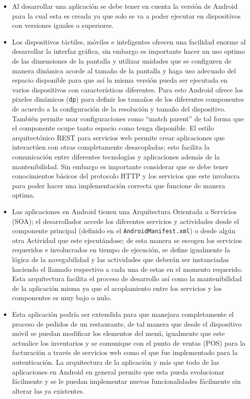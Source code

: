\documentclass[letterpaper,12pt]{book}
\begin{document}
\begin{mainmatter}
\begin{itemize}
\item Al desarrollar  una aplicación se debe  tener en cuenta  la versión de
Android para la cual esta es creada ya que solo se va a poder ejecutar
en dispositivos con versiones iguales o superiores.

\item Los  dispositivos   táctiles,  móviles  e   inteligentes  ofrecen  una
facilidad enorme  al desarrollar la  interfaz gráfica, sin  embargo es
importante hacer  un uso  optimo de las  dimensiones de la  pantalla y
utilizar  unidades que  se  configuren de  manera  dinámica acorde  al
tamaño de la pantalla y  haga uso adecuado del espacio disponible para
que así  la misma versión  pueda ser ejecutada en  varios dispositivos
con características  diferentes. Para esto Android  ofrece los pixeles
dinámicos (\texttt{dp}) para definir  los tamaños de los diferentes componentes
de  acuerdo  a  la  configuración   de  la  resolución  y  tamaño  del
dispositivo. También permite  usar configuraciones como “match parent”
de  tal  forma  que  el  componente ocupe  tanto  espacio  como  tenga
disponible.  El estilo arquitectónico  REST para servicios web permite
crear   aplicaciones   que   interactúen   con   otras   completamente
desacopladas;   esto  facilita   la   comunicación  entre   diferentes
tecnologías y aplicaciones además de la mantenibilidad. Sin embargo es
importante  considerar que  se  debe tener  conocimientos básicos  del
protocolo HTTP y los servicios que este involucra para poder hacer una
implementación correcta que funcione de manera optima.

\item Las  aplicaciones  en  Android  tienen una  Arquitectura  Orientada  a
Servicios (SOA);  el desarrollador  accede los diferentes  servicios y
actividades   desde   el   componente   principal  (definido   en   el
\texttt{AndroidManifest.xml})   o   desde  algún   otra   Actividad  que   este
ejecutándose;  de esta manera  se escogen  los servicios  requeridos e
involucrados en tiempo de ejecución, se define igualmente la lógica de
la  navegabilidad  y  las  actividades que  deberán  ser  instanciadas
haciendo  el llamado  respectivo a  cada una  de estas  en  el momento
requerido.  Esta arquitectura  facilita el  proceso de  desarrollo así
como la mantenibilidad  de la aplicación misma ya  que el acoplamiento
entre los servicios y los componentes es muy bajo o nulo.

\item Esta aplicación  podría ser extendida para  que manejara completamente
el proceso  de pedidos de un  restaurante, de tal manera  que desde el
dispositivo  móvil  se  puedan   modificar  los  elementos  del  menú,
igualmente que  este actualice los  inventarios y se comunique  con el
punto de  ventas (POS) para la  facturación a través  de servicios web
como el que fue implementado para la autenticación. La arquitectura de
la aplicación y más que todo de las aplicaciones en Android en general
permite  que  esta  pueda   evolucionar  fácilmente  y  se  le  puedan
implementar  nuevas  funcionalidades  fácilmente  sin alterar  las  ya
existentes.


\end{itemize}
\end{mainmatter}
\end{document}
